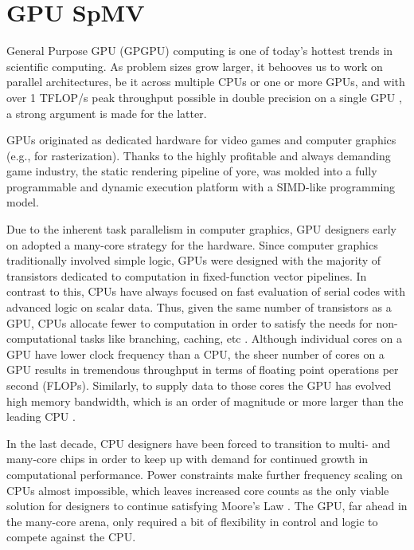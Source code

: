 \documentclass{report}
\begin{document}
\fi

\chapter{GPU SpMV}
\label{chap:gpu_rbffd}

General Purpose GPU (GPGPU) computing is one of today's hottest trends in scientific computing. As problem sizes grow larger, it behooves us to work on parallel architectures, be it across multiple CPUs or one or more GPUs, and with over 1 TFLOP/s peak throughput possible in double precision on a single GPU \cite{KeplerFactSheet}, a strong argument is made for the latter. 

GPUs originated as dedicated hardware for video games and computer graphics (e.g., for rasterization). Thanks to the highly profitable and always demanding game industry, the static rendering pipeline of yore, was molded into a fully programmable and dynamic execution platform with a SIMD-like programming model. 


Due to the inherent task parallelism in computer graphics, GPU designers early on adopted a many-core strategy for the hardware. Since computer graphics traditionally involved simple logic, GPUs were designed with the majority of transistors dedicated to computation in fixed-function vector pipelines. In contrast to this, CPUs have always focused on fast evaluation of serial codes with advanced logic on scalar data. Thus, given the same number of transistors as a GPU, CPUs allocate fewer to computation in order to satisfy the needs for non-computational tasks like branching, caching, etc \cite{Owens2007,CudaGuide2013}. Although individual cores on a GPU have lower clock frequency than a CPU, the sheer number of cores on a GPU results in tremendous throughput in terms of floating point operations per second (FLOPs). Similarly, to supply data to those cores the GPU has evolved high memory bandwidth, which is an order of magnitude or more larger than the leading CPU \cite{CudaGuide2013}. 


In the last decade, CPU designers have been forced to transition to multi- and many-core chips in order to keep up with demand for continued growth in computational performance. Power constraints make further frequency scaling on CPUs almost impossible, which leaves increased core counts as the only viable solution for designers to continue satisfying Moore's Law \cite{Owens2007}. The GPU, far ahead in the many-core arena, only required a bit of flexibility in control and logic to compete against the CPU. 
\end{document}
